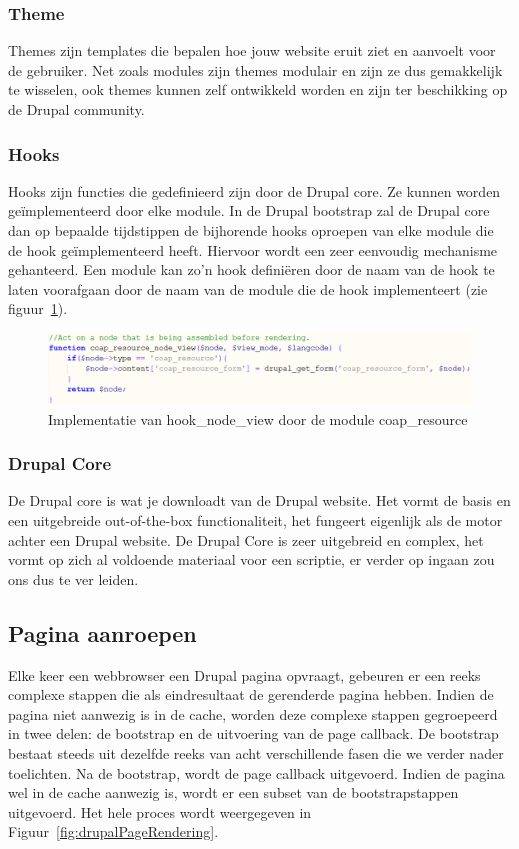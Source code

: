 \subsubsection{Theme}
Themes zijn templates die bepalen hoe jouw website eruit ziet en aanvoelt voor de gebruiker. Net zoals modules zijn themes modulair en zijn ze dus gemakkelijk te wisselen, ook themes kunnen zelf ontwikkeld worden en zijn ter beschikking op de Drupal community.

\subsubsection{Hooks}
Hooks zijn functies die gedefinieerd zijn door de Drupal core. Ze kunnen worden ge\"{i}mplementeerd door elke module. In de Drupal bootstrap zal de Drupal core dan op bepaalde tijdstippen de bijhorende hooks oproepen van elke module die de hook ge\"{i}mplementeerd heeft. Hiervoor wordt een zeer eenvoudig mechanisme gehanteerd. Een module kan zo'n hook defini\"{e}ren door de naam van de hook te laten voorafgaan door de naam van de module die de hook implementeert (zie figuur~\ref{fig:drupalHookExample}).
\begin{figure}[h]
\includegraphics[width=1\textwidth]{fig/drupalHookExample}
\caption{Implementatie van hook\_node\_view door de module coap\_resource}
\label{fig:drupalHookExample}
\end{figure}

\subsubsection{Drupal Core}
De Drupal core is wat je downloadt van de Drupal website. Het vormt de basis en een uitgebreide out-of-the-box functionaliteit, het fungeert eigenlijk als de motor achter een Drupal website. De Drupal Core is zeer uitgebreid en complex, het vormt op zich al voldoende materiaal voor een scriptie, er verder op ingaan zou ons dus te ver leiden. %

\subsection{Pagina aanroepen}
Elke keer een webbrowser een Drupal pagina opvraagt, gebeuren er een reeks complexe stappen die als eindresultaat de gerenderde pagina hebben. Indien de pagina niet aanwezig is in de cache, worden deze complexe stappen gegroepeerd in twee delen: de bootstrap en de uitvoering van de page callback. De bootstrap bestaat steeds uit dezelfde reeks van acht verschillende fasen die we verder nader toelichten. Na de bootstrap, wordt de page callback uitgevoerd. Indien de pagina wel in de cache aanwezig is, wordt er een subset van de bootstrapstappen uitgevoerd. Het hele proces wordt weergegeven in Figuur~\ref{fig:drupalPageRendering}.

